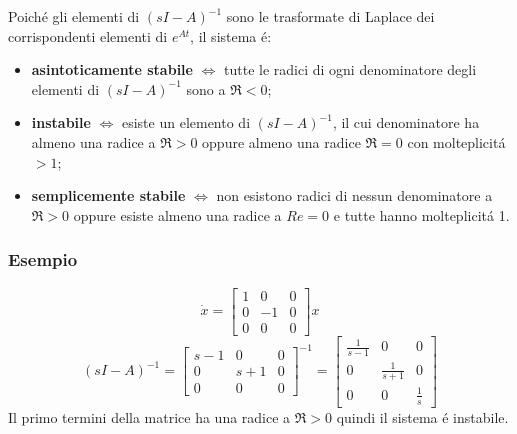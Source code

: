 \documentclass[../main.tex]{subfiles}
\begin{document}
		Poich\'e gli elementi di $ (sI-A)^{-1} $ sono le trasformate di Laplace dei corrispondenti elementi di $ e^{At} $, il sistema \'e:
		\begin{itemize}
			\item
				\textbf{asintoticamente stabile} $ \Leftrightarrow $ tutte le radici di ogni denominatore degli elementi di $ (sI-A)^{-1} $ sono a $ \Re < 0 $;
			\item
				\textbf{instabile} $ \Leftrightarrow $ esiste un elemento di $ (sI-A)^{-1} $, il cui denominatore ha almeno una radice a $ \Re > 0 $ oppure almeno una radice $ \Re = 0 $ con molteplicit\'a $ > 1 $;
			\item
				\textbf{semplicemente stabile} $ \Leftrightarrow $ non esistono radici di nessun denominatore a $ \Re > 0 $ oppure esiste almeno una radice a $ Re = 0 $ e tutte hanno molteplicit\'a 1.
		\end{itemize}
	
	\subsubsection*{Esempio}
		\[ \dot x =
			\begin{bmatrix}
				1 & 0 & 0\\
				0 & -1 & 0\\
				0 & 0 & 0
			\end{bmatrix} x
		\]
		\[ (sI-A)^{-1} =
			\begin{bmatrix}
				s-1 & 0 & 0\\
				0 & s+1 & 0\\
				0 & 0 & 0
			\end{bmatrix}^{-1} =
			\begin{bmatrix}
				\frac{1}{s-1} & 0 & 0\\
				0 & \frac{1}{s+1} & 0\\
				0 & 0 & \frac{1}{s}
			\end{bmatrix}
		\]
		Il primo termini della matrice ha una radice a $ \Re > 0 $ quindi il sistema \'e instabile.
		
\end{document}
